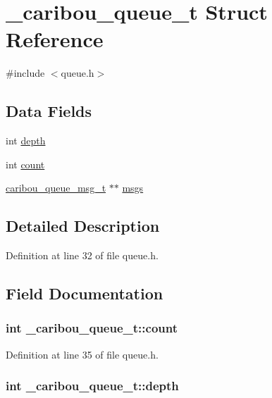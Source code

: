 \hypertarget{struct__caribou__queue__t}{\section{\-\_\-caribou\-\_\-queue\-\_\-t Struct Reference}
\label{struct__caribou__queue__t}
}


{\ttfamily \#include $<$queue.\-h$>$}

\subsection*{Data Fields}
\begin{DoxyCompactItemize}
\item 
int \hyperlink{struct__caribou__queue__t_a36561a93d0a9633ac57652fccf226a0d}{depth}
\item 
int \hyperlink{struct__caribou__queue__t_ad2ba7b33d5fc10a0e1e9a69c5980f76d}{count}
\item 
\hyperlink{queue_8h_aa9897960939163cc502ee337bd73256d}{caribou\-\_\-queue\-\_\-msg\-\_\-t} $\ast$$\ast$ \hyperlink{struct__caribou__queue__t_ab8bca88f308064d85e3984e7309a60a3}{msgs}
\end{DoxyCompactItemize}


\subsection{Detailed Description}


Definition at line 32 of file queue.\-h.



\subsection{Field Documentation}
\hypertarget{struct__caribou__queue__t_ad2ba7b33d5fc10a0e1e9a69c5980f76d}{
\subsubsection[{count}]{\setlength{\rightskip}{0pt plus 5cm}int \-\_\-caribou\-\_\-queue\-\_\-t\-::count}}\label{struct__caribou__queue__t_ad2ba7b33d5fc10a0e1e9a69c5980f76d}


Definition at line 35 of file queue.\-h.

\hypertarget{struct__caribou__queue__t_a36561a93d0a9633ac57652fccf226a0d}{
\subsubsection[{depth}]{\setlength{\rightskip}{0pt plus 5cm}int \-\_\-caribou\-\_\-queue\-\_\-t\-::depth}}\label{struct__caribou__queue__t_a36561a93d0a9633ac57652fccf226a0d}


